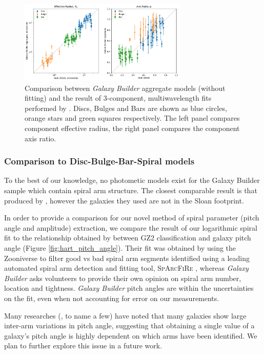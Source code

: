 \documentclass[../main.tex]{subfiles}
\begin{document}
\begin{figure}
  \includegraphics[width=8cm]{images__results/sd_comp_comparison.pdf}
  \caption{Comparison between \textit{Galaxy Builder} aggregate models (without fitting) and the result of 3-component, multi\-wavelength fits performed by \citet{2018MNRAS.473.4731K}. Discs, Bulges and Bars are shown as blue circles, orange stars and green squares respectively. The left panel compares component effective radius, the right panel compares the component axis ratio.}
  \label{fig:sd_comp_comparison}
\end{figure}


\subsubsection{Comparison to Disc-Bulge-Bar-Spiral models}
To the best of our knowledge, no photometic models exist for the Galaxy Builder sample which contain spiral arm structure. The closest comparable result is that produced by \citet{Gao2017:1709.00746v1}, however the galaxies they used are not in the Sloan footprint.

In order to provide a comparison for our novel method of spiral parameter (pitch angle and amplitude) extraction, we compare the result of our logarithmic spiral fit to the relationship obtained by \citet{Hart2016:1607.01019v1} between GZ2 classification and galaxy pitch angle (Figure \ref{fig:hart_pitch_angle}). Their fit was obtained by using the Zooniverse to filter good vs bad spiral arm segments identified using a leading automated spiral arm detection and fitting tool, \textsc{SpArcFiRe} \citep{Davis2014:1402.1910v1}, whereas \textit{Galaxy Builder} asks volunteers to provide their own opinion on spiral arm number, location and tightness. \textit{Galaxy Builder} pitch angles are within the uncertainties on the \citet{Hart2016:1607.01019v1} fit, even when not accounting for error on our measurements.

Many researches (\citealt{Davis2014:1402.1910v1}, \citealt{2019arXiv190804246D} to name a few) have noted that many galaxies show large inter-arm variations in pitch angle, suggesting that obtaining a single value of a galaxy's pitch angle is highly dependent on which arms have been identified. We plan to further explore this issue in a future work.
\end{document}
